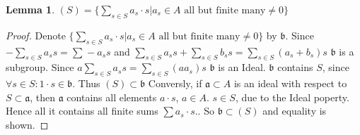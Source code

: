 \documentclass[a4paper,oneside,11pt]{article}
\newtheorem{lem}[thm]{Lemma}
\begin{document}
\begin{lem}
  $ (S)= \{ \sum\limits_{s\in S}^{}a_s\cdot s | a_s\in A \text{ all but finite many} \neq 0 \}$
\end{lem}
\begin{proof}
Denote $ \{ \sum\limits_{s\in S}^{}a_s\cdot s | a_s\in A \text{ all but finite many} \neq 0 \} $ by $ \mathfrak{b} $. 
Since $ -\sum\limits_{s\in S}^{}a_s s=\sum\limits_{}^{}-a_s s $ and $ \sum\limits_{s\in S}^{}a_s s+\sum\limits_{s\in S}^{}b_s s=\sum\limits_{s\in S}^{}(a_s+b_s)s $ $ \mathfrak{b} $ is a subgroup. 
Since $ a \sum\limits_{s\in S}^{}a_s s=\sum\limits_{s\in S}^{}(aa_s)s $ $ \mathfrak{b} $ is an Ideal.
$ \mathfrak{b} $ contains $ S $, since $ \forall s\in S: 1\cdot s\in \mathfrak{b} $. Thus $ (S)\subset \mathfrak{b} $
Conversly, if $ \mathfrak{a}\subset A $ is an ideal with respect to $ S\subset \mathfrak{a} $, then $ \mathfrak{a} $ contains all elements $ a\cdot s $, $ a\in A $. $ s\in S $, due to the Ideal poperty. Hence all it contains all finite sums $ \sum a_s\cdot s$.. So $ \mathfrak{b}\subset (S) $ and equality is shown. 
\end{proof}
\end{document}
